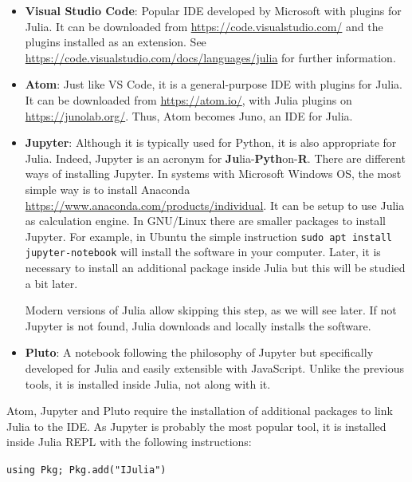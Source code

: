 \begin{itemize}
	\item \textbf{Visual Studio Code}: Popular IDE developed by Microsoft with plugins for Julia. It can be downloaded from \href{https://code.visualstudio.com/}{https://code.visualstudio.com/} and the plugins installed as an extension. See \href{https://code.visualstudio.com/docs/languages/julia}{https://code.visualstudio.com/docs/languages/julia} for further information.
	\item \textbf{Atom}: Just like VS Code, it is a general-purpose IDE with plugins for Julia. It can be downloaded from \href{https://atom.io/}{https://atom.io/}, with Julia plugins on \href{https://junolab.org/}{https://junolab.org/}. Thus, Atom becomes Juno, an IDE for Julia.
	\item \textbf{Jupyter}: Although it is typically used for Python, it is also appropriate for Julia. Indeed, Jupyter is an acronym for \textbf{Ju}lia-\textbf{Pyth}on-\textbf{R}. There are different ways of installing Jupyter. In systems with Microsoft Windows OS, the most simple way is to install Anaconda \href{https://www.anaconda.com/products/individual}{https://www.anaconda.com/products/individual}. It can be setup to use Julia as calculation engine. In GNU/Linux there are smaller packages to install Jupyter. For example, in Ubuntu the simple instruction \texttt{sudo apt install jupyter-notebook} will install the software in your computer. Later, it is necessary to install an additional package inside Julia but this will be studied a bit later.
	
	Modern versions of Julia allow skipping this step, as we will see later. If not Jupyter is not found, Julia  downloads and locally installs the software.
	\item \textbf{Pluto}: A notebook following the philosophy of Jupyter but specifically developed for Julia and easily extensible with JavaScript. Unlike the previous tools, it is installed inside Julia, not along with it. 
\end{itemize}
%
Atom, Jupyter and Pluto require the installation of additional packages to link Julia to the IDE. As Jupyter is probably the most popular tool, it is installed inside Julia REPL with the following instructions:

\vspace{1mm}
\begin{center}
	\texttt{using Pkg; Pkg.add("IJulia")}
\end{center}
\vspace{1mm}

